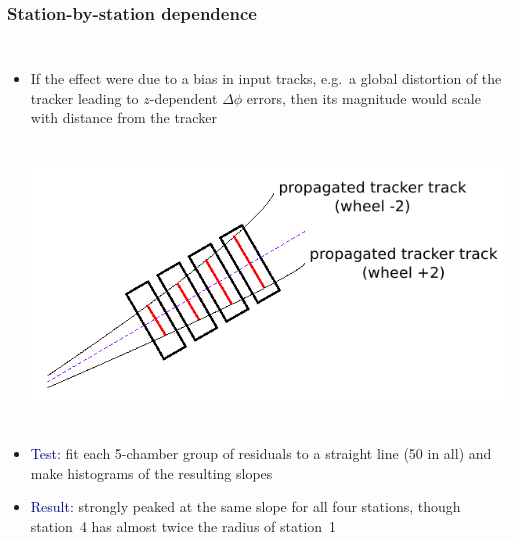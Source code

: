 \documentclass[compress]{beamer}
\begin{document}
\begin{frame}
\frametitle{Station-by-station dependence}
\begin{columns}
\begin{itemize}
\item If the effect were due to a bias in input tracks, e.g.\ a global
distortion of the tracker leading to $z$-dependent $\Delta \phi$
errors, then its magnitude would scale with distance from the tracker

\mbox{ } \hfill \includegraphics[width=0.75\linewidth]{growth_with_station.png} \hfill \mbox{ }

\item \textcolor{darkblue}{Test:} fit each 5-chamber group of residuals to a straight line
(50 in all) and make histograms of the resulting slopes
\item \textcolor{darkblue}{Result:} strongly peaked at the same slope
  for all four stations, though station~4 has almost twice the radius of
  station~1
\end{itemize}


\end{columns}
\end{frame}
\end{document}

